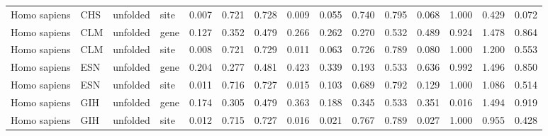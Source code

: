 \begin{longtable}{llllrrrrrrrrrrr}
        Homo sapiens &                       CHS &  unfolded &  site &                              0.007 &                               0.721 &                 0.728 &                 0.009 &                              0.055 &                               0.740 &                 0.795 &                 0.068 &        1.000 &  0.429 &  0.072 \\
        Homo sapiens &                       CLM &  unfolded &  gene &                              0.127 &                               0.352 &                 0.479 &                 0.266 &                              0.262 &                               0.270 &                 0.532 &                 0.489 &        0.924 &  1.478 &  0.864 \\
        Homo sapiens &                       CLM &  unfolded &  site &                              0.008 &                               0.721 &                 0.729 &                 0.011 &                              0.063 &                               0.726 &                 0.789 &                 0.080 &        1.000 &  1.200 &  0.553 \\
        Homo sapiens &                       ESN &  unfolded &  gene &                              0.204 &                               0.277 &                 0.481 &                 0.423 &                              0.339 &                               0.193 &                 0.533 &                 0.636 &        0.992 &  1.496 &  0.850 \\
        Homo sapiens &                       ESN &  unfolded &  site &                              0.011 &                               0.716 &                 0.727 &                 0.015 &                              0.103 &                               0.689 &                 0.792 &                 0.129 &        1.000 &  1.086 &  0.514 \\
        Homo sapiens &                       GIH &  unfolded &  gene &                              0.174 &                               0.305 &                 0.479 &                 0.363 &                              0.188 &                               0.345 &                 0.533 &                 0.351 &        0.016 &  1.494 &  0.919 \\
        Homo sapiens &                       GIH &  unfolded &  site &                              0.012 &                               0.715 &                 0.727 &                 0.016 &                              0.021 &                               0.767 &                 0.789 &                 0.027 &        1.000 &  0.955 &  0.428 \\

\end{longtable}
